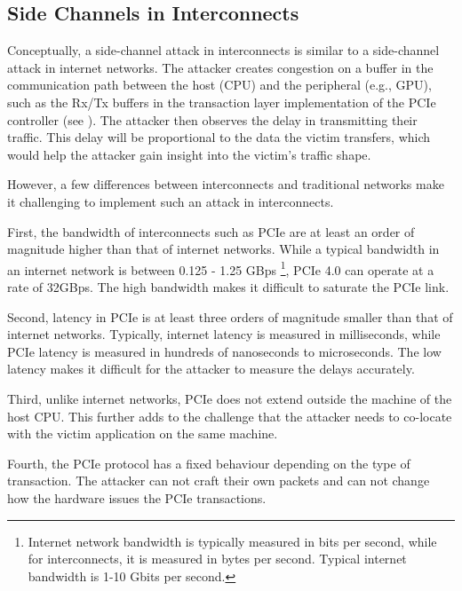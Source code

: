 \subsection{Side Channels in Interconnects}
\label{subsec:interconnect-sc-background-side-channels}

Conceptually, a side-channel attack in interconnects is similar to a side-channel attack in internet networks. 
The attacker creates congestion on a buffer in the communication path between the host (CPU) and the peripheral (e.g., GPU), such as the Rx/Tx buffers in the transaction layer implementation of the PCIe controller (see ).
The attacker then observes the delay in transmitting their traffic.
This delay will be proportional to the data the victim transfers, which would help the attacker gain insight into the victim's traffic shape.

However, a few differences between interconnects and traditional networks make it challenging to implement such an attack in interconnects.

First, the bandwidth of interconnects such as PCIe are at least an order of magnitude higher than that of internet networks.
While a typical bandwidth in an internet network is between 0.125 - 1.25 GBps 
\footnote{Internet network bandwidth is typically measured in bits per second, while for interconnects, it is measured in bytes per second. Typical internet bandwidth is 1-10 Gbits per second.},
PCIe 4.0 can operate at a rate of 32GBps.
The high bandwidth makes it difficult to saturate the PCIe link.

Second, latency in PCIe is at least three orders of magnitude smaller than that of internet networks.
Typically, internet latency is measured in milliseconds, while PCIe latency is measured in hundreds of nanoseconds to microseconds.
The low latency makes it difficult for the attacker to measure the delays accurately.

Third, unlike internet networks, PCIe does not extend outside the machine of the host CPU.
This further adds to the challenge that the attacker needs to co-locate with the victim application on the same machine.

Fourth, the PCIe protocol has a fixed behaviour depending on the type of transaction.
The attacker can not craft their own packets and can not change how the hardware issues the PCIe transactions.


